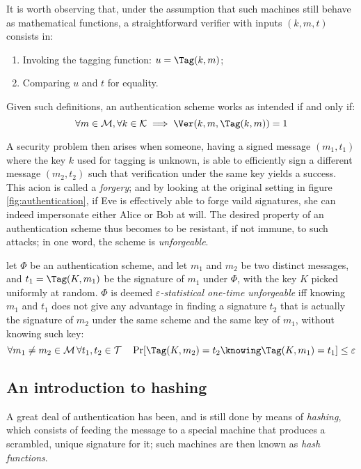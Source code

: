 It is worth observing that, under the assumption that such machines still behave as mathematical functions, a straightforward verifier with inputs $(k, m, t)$ consists in:
\begin{enumerate}
    \item Invoking the tagging function: $u = \Tag(k, m)$;
    \item Comparing $u$ and $t$ for equality.
\end{enumerate}

Given such definitions, an authentication scheme works as intended if and only if:
\[
    \forall m \in \M, \forall k \in \K \implies \Ver(k, m, \Tag(k, m)) = 1
\]

A security problem then arises when someone, having a signed message $(m_1, t_1)$ where the key $k$ used for tagging is unknown, is able to efficiently sign a different message $(m_2, t_2)$ such that verification under the same key yields a success. This acion is called a \emph{forgery}; and by looking at the original setting in figure \ref{fig:authentication}, if Eve is effectively able to forge vaild signatures, she can indeed impersonate either Alice or Bob at will. The desired property of an authentication scheme thus becomes to be resistant, if not immune, to such attacks; in one word, the scheme is \emph{unforgeable}.

\begin{definition}
    let $\Phi$ be an authentication scheme, and let $m_1$ and $m_2$ be two distinct messages, and $t_1 = \Tag(K, m_1)$ be the signature of $m_1$ under $\Phi$, with the key $K$ picked uniformly at random. $\Phi$ is deemed \emph{$\varepsilon$-statistical one-time unforgeable} iff knowing $m_1$ and $t_1$ does not give any advantage in finding a signature $t_2$ that is actually the signature of $m_2$ under the same scheme and the same key of $m_1$, without knowing such key:
    \[
        \forall m_1 \neq m_2 \in \M \, \forall t_1, t_2 \in \T \quad \Pr[\Tag(K, m_2) = t_2 \knowing \Tag(K, m_1) = t_1] \leq \varepsilon
    \]
\end{definition}

\subsection{An introduction to hashing}

A great deal of authentication has been, and is still done by means of \emph{hashing}, which consists of feeding the message to a special machine that produces a scrambled, unique signature for it; such machines are then known as \emph{hash functions}.

